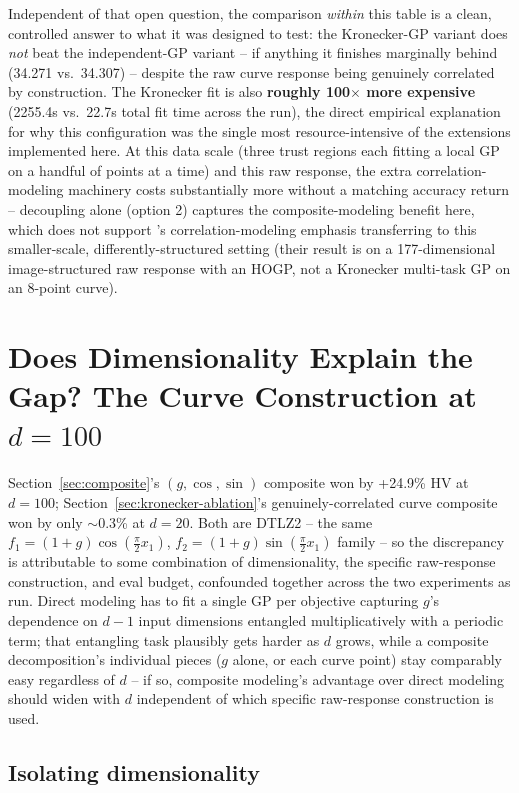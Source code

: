 \documentclass[11pt]{article}
\begin{document}
Independent of that open question, the comparison \emph{within} this table
is a clean, controlled answer to what it was designed to test: the
Kronecker-GP variant does \emph{not} beat the independent-GP variant -- if
anything it finishes marginally behind (34.271 vs.\ 34.307) -- despite the
raw curve response being genuinely correlated by construction. The
Kronecker fit is also \textbf{roughly 100$\times$ more expensive}
(2255.4s vs.\ 22.7s total fit time across the run), the direct empirical
explanation for why this configuration was the single most resource-intensive
of the extensions implemented here. At this data scale (three trust regions
each fitting a local GP on a handful of points at a time) and this raw
response, the extra correlation-modeling machinery costs substantially more
without a matching accuracy return -- decoupling alone (option 2) captures
the composite-modeling benefit here, which does not support
\citeauthor{maddox2021hogp}'s correlation-modeling emphasis transferring to
this smaller-scale, differently-structured setting (their result is on a
177-dimensional image-structured raw response with an HOGP, not a
Kronecker multi-task GP on an 8-point curve).

\section{Does Dimensionality Explain the Gap? The Curve Construction at $d=100$}
\label{sec:curve-100d}

Section~\ref{sec:composite}'s $(g,\cos,\sin)$ composite won by +24.9\% HV at
$d=100$; Section~\ref{sec:kronecker-ablation}'s genuinely-correlated curve
composite won by only $\sim$0.3\% at $d=20$. Both are DTLZ2 -- the same
$f_1=(1+g)\cos(\tfrac{\pi}{2}x_1)$, $f_2=(1+g)\sin(\tfrac{\pi}{2}x_1)$
family -- so the discrepancy is attributable to some combination of
dimensionality, the specific raw-response construction, and eval budget,
confounded together across the two experiments as run. Direct modeling has
to fit a single GP per objective capturing $g$'s dependence on $d-1$ input
dimensions entangled multiplicatively with a periodic term; that entangling
task plausibly gets harder as $d$ grows, while a composite decomposition's
individual pieces ($g$ alone, or each curve point) stay comparably easy
regardless of $d$ -- if so, composite modeling's advantage over direct
modeling should widen with $d$ independent of which specific raw-response
construction is used.

\subsection{Isolating dimensionality}
\end{document}
